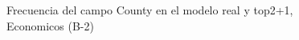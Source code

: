 \begin{figure}[H]
    \centering
    
    \caption{Frecuencia del campo County en el modelo real y top2+1, Economicos (B-2)}
    \label{frecuency-County-top2+1}
\end{figure}